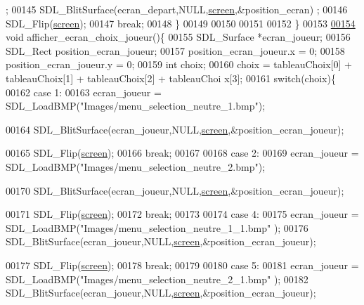 \begin{DoxyCode}
      ;
00145                         SDL\_BlitSurface(ecran\_depart,NULL,\hyperlink{fonction_interface_8h_a78fa3957d73de49cb81d047857504218}{screen},&position\_ecran)
      ;
00146                         SDL\_Flip(\hyperlink{fonction_interface_8h_a78fa3957d73de49cb81d047857504218}{screen});
00147                         \textcolor{keywordflow}{break};
00148         \}
00149 
00150 
00151 
00152 \}
00153 
\hypertarget{fonction_interface_8c_source_l00154}{}\hyperlink{fonction_interface_8h_a57441c18ac94ad4618d8ecd732b8ec2b}{00154} \textcolor{keywordtype}{void} afficher\_ecran\_choix\_joueur()\{
00155         SDL\_Surface *ecran\_joueur;
00156         SDL\_Rect position\_ecran\_joueur;
00157         position\_ecran\_joueur.x = 0;
00158         position\_ecran\_joueur.y = 0;
00159         \textcolor{keywordtype}{int} choix;
00160         choix = tableauChoix[0] + tableauChoix[1] + tableauChoix[2] + tableauChoi
      x[3];
00161         \textcolor{keywordflow}{switch}(choix)\{
00162         \textcolor{keywordflow}{case} 1:
00163                 ecran\_joueur = SDL\_LoadBMP(\textcolor{stringliteral}{"Images/menu\_selection\_neutre\_1.bmp"});
      
00164                 SDL\_BlitSurface(ecran\_joueur,NULL,\hyperlink{fonction_interface_8h_a78fa3957d73de49cb81d047857504218}{screen},&position\_ecran\_joueur);
      
00165                 SDL\_Flip(\hyperlink{fonction_interface_8h_a78fa3957d73de49cb81d047857504218}{screen});
00166                 \textcolor{keywordflow}{break};
00167 
00168         \textcolor{keywordflow}{case} 2:
00169                 ecran\_joueur = SDL\_LoadBMP(\textcolor{stringliteral}{"Images/menu\_selection\_neutre\_2.bmp"});
      
00170                 SDL\_BlitSurface(ecran\_joueur,NULL,\hyperlink{fonction_interface_8h_a78fa3957d73de49cb81d047857504218}{screen},&position\_ecran\_joueur);
      
00171                 SDL\_Flip(\hyperlink{fonction_interface_8h_a78fa3957d73de49cb81d047857504218}{screen});
00172                 \textcolor{keywordflow}{break};
00173 
00174         \textcolor{keywordflow}{case} 4:
00175                 ecran\_joueur = SDL\_LoadBMP(\textcolor{stringliteral}{"Images/menu\_selection\_neutre\_1\_1.bmp"
      });
00176                 SDL\_BlitSurface(ecran\_joueur,NULL,\hyperlink{fonction_interface_8h_a78fa3957d73de49cb81d047857504218}{screen},&position\_ecran\_joueur);
      
00177                 SDL\_Flip(\hyperlink{fonction_interface_8h_a78fa3957d73de49cb81d047857504218}{screen});
00178                 \textcolor{keywordflow}{break};
00179 
00180         \textcolor{keywordflow}{case} 5:
00181                 ecran\_joueur = SDL\_LoadBMP(\textcolor{stringliteral}{"Images/menu\_selection\_neutre\_2\_1.bmp"
      });
00182                 SDL\_BlitSurface(ecran\_joueur,NULL,\hyperlink{fonction_interface_8h_a78fa3957d73de49cb81d047857504218}{screen},&position\_ecran\_joueur);
      

\end{DoxyCode}
